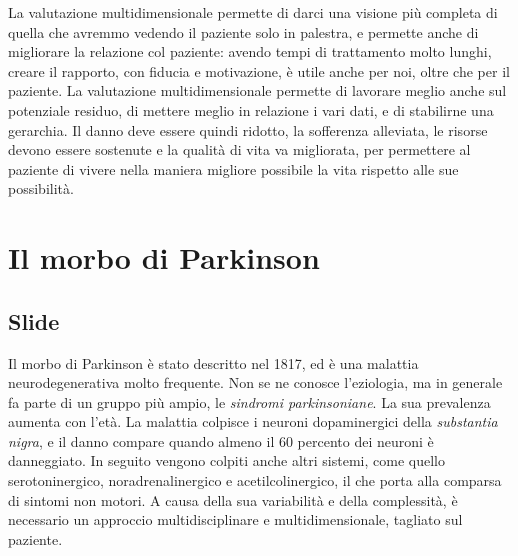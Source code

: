 La valutazione multidimensionale permette di darci una visione più completa di 
quella che avremmo vedendo il paziente solo in palestra, e permette anche di 
migliorare la relazione col paziente: avendo tempi di trattamento molto lunghi, 
creare il rapporto, con fiducia e motivazione, è utile anche per noi, oltre 
che per il paziente. La valutazione multidimensionale permette di lavorare 
meglio anche sul potenziale residuo, di mettere meglio in relazione i vari 
dati, 
e di stabilirne una gerarchia. Il danno deve essere quindi ridotto, la 
sofferenza alleviata, le risorse devono essere sostenute e la qualità di vita 
va migliorata, per permettere al paziente di vivere nella maniera migliore 
possibile la vita rispetto alle sue possibilità.

\section{Il morbo di Parkinson}
\subsection{Slide}
Il morbo di Parkinson è stato descritto nel 1817, ed è una malattia
neurodegenerativa molto frequente. Non se ne conosce l'eziologia, ma in generale
fa parte di un gruppo più ampio, le \textit{sindromi parkinsoniane}. La sua
prevalenza aumenta con l'età. La malattia colpisce i neuroni dopaminergici della
\textit{substantia nigra}, e il danno compare quando almeno il 60 percento dei
neuroni è danneggiato. In seguito vengono colpiti anche altri sistemi, come
quello serotoninergico, noradrenalinergico e acetilcolinergico, il che porta
alla comparsa di sintomi non motori. A causa della sua variabilità e della
complessità, è necessario un approccio multidisciplinare e multidimensionale,
tagliato sul paziente.

